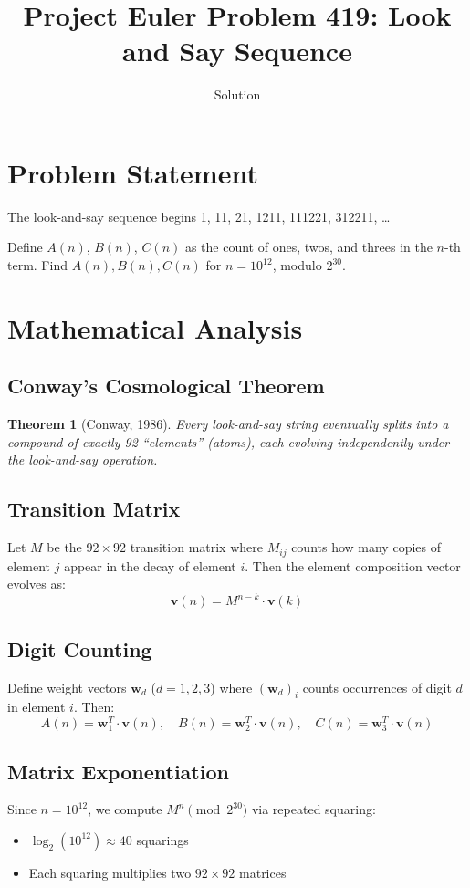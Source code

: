 \documentclass[12pt]{article}
\title{Project Euler Problem 419: Look and Say Sequence}
\author{Solution}
\date{}
\newtheorem{theorem}{Theorem}
\theoremstyle{definition}
\begin{document}
\maketitle

\section{Problem Statement}
The look-and-say sequence begins 1, 11, 21, 1211, 111221, 312211, \ldots

Define $A(n)$, $B(n)$, $C(n)$ as the count of ones, twos, and threes in the $n$-th term. Find $A(n), B(n), C(n)$ for $n = 10^{12}$, modulo $2^{30}$.

\section{Mathematical Analysis}

\subsection{Conway's Cosmological Theorem}
\begin{theorem}[Conway, 1986]
Every look-and-say string eventually splits into a compound of exactly 92 ``elements'' (atoms), each evolving independently under the look-and-say operation.
\end{theorem}

\subsection{Transition Matrix}
Let $M$ be the $92 \times 92$ transition matrix where $M_{ij}$ counts how many copies of element $j$ appear in the decay of element $i$. Then the element composition vector evolves as:
\[
\mathbf{v}(n) = M^{n-k} \cdot \mathbf{v}(k)
\]

\subsection{Digit Counting}
Define weight vectors $\mathbf{w}_d$ ($d = 1, 2, 3$) where $(\mathbf{w}_d)_i$ counts occurrences of digit $d$ in element $i$. Then:
\[
A(n) = \mathbf{w}_1^T \cdot \mathbf{v}(n), \quad
B(n) = \mathbf{w}_2^T \cdot \mathbf{v}(n), \quad
C(n) = \mathbf{w}_3^T \cdot \mathbf{v}(n)
\]

\subsection{Matrix Exponentiation}
Since $n = 10^{12}$, we compute $M^n \pmod{2^{30}}$ via repeated squaring:
\begin{itemize}
    \item $\log_2(10^{12}) \approx 40$ squarings
    \item Each squaring multiplies two $92 \times 92$ matrices
\end{itemize}
\end{document}
